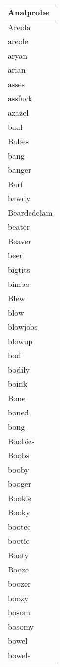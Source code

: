 \begin{longtable}{|l|}
Analprobe \\ \hline 
Areola \\ \hline 
areole \\ \hline 
aryan \\ \hline 
arian \\ \hline 
asses \\ \hline 
assfuck \\ \hline 
azazel \\ \hline 
baal \\ \hline 
Babes \\ \hline 
bang \\ \hline 
banger \\ \hline 
Barf \\ \hline 
bawdy \\ \hline 
Beardedclam \\ \hline 
beater \\ \hline 
Beaver \\ \hline 
beer \\ \hline 
bigtits \\ \hline 
bimbo \\ \hline 
Blew \\ \hline 
blow \\ \hline 
blowjobs \\ \hline 
blowup \\ \hline 
bod \\ \hline 
bodily \\ \hline 
boink \\ \hline 
Bone \\ \hline 
boned \\ \hline 
bong \\ \hline 
Boobies \\ \hline 
Boobs \\ \hline 
booby \\ \hline 
booger \\ \hline 
Bookie \\ \hline 
Booky \\ \hline 
bootee \\ \hline 
bootie \\ \hline 
Booty \\ \hline 
Booze \\ \hline 
boozer \\ \hline 
boozy \\ \hline 
bosom \\ \hline 
bosomy \\ \hline 
bowel \\ \hline 
bowels \\ \hline 

\end{longtable}
